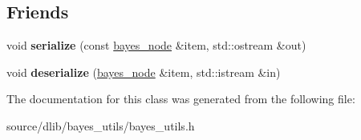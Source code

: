 \subsection*{Friends}
\begin{DoxyCompactItemize}
\item 
\hypertarget{classdlib_1_1bayes__node_afa25c2d742bf3c9d80deb7d965755a39}{
void {\bfseries serialize} (const \hyperlink{classdlib_1_1bayes__node}{bayes\_\-node} \&item, std::ostream \&out)}
\label{classdlib_1_1bayes__node_afa25c2d742bf3c9d80deb7d965755a39}

\item 
\hypertarget{classdlib_1_1bayes__node_a18a0d688066c0e223ad844ee44ff2cbb}{
void {\bfseries deserialize} (\hyperlink{classdlib_1_1bayes__node}{bayes\_\-node} \&item, std::istream \&in)}
\label{classdlib_1_1bayes__node_a18a0d688066c0e223ad844ee44ff2cbb}

\end{DoxyCompactItemize}


The documentation for this class was generated from the following file:\begin{DoxyCompactItemize}
\item 
source/dlib/bayes\_\-utils/bayes\_\-utils.h\end{DoxyCompactItemize}

